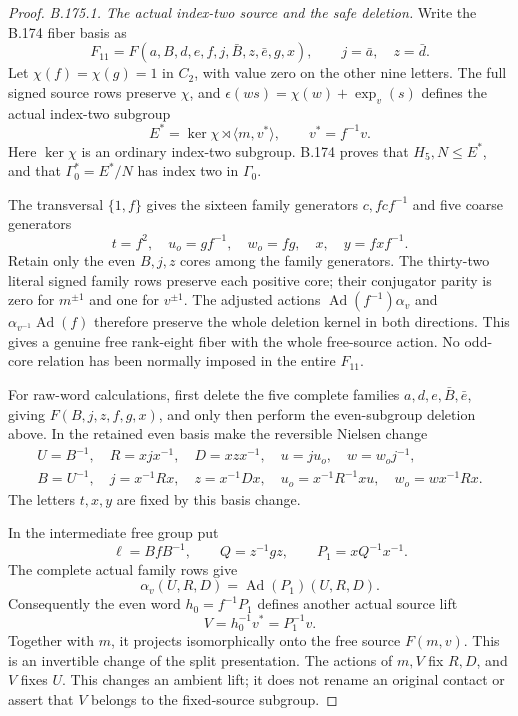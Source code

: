 \begin{proof}
\emph{B.175.1. The actual index-two source and the safe deletion.}
Write the B.174 fiber basis as
\[
 F_{11}=F(a,B,d,e,f,j,\bar B,z,\bar e,g,x),
 \qquad j=\bar a,\quad z=\bar d.
\]
Let \(\chi(f)=\chi(g)=1\) in \(C_2\), with value zero on the other
nine letters. The full signed source rows preserve \(\chi\), and
\(\epsilon(ws)=\chi(w)+\operatorname{exp}_v(s)\) defines the actual
index-two subgroup
\[
 E^*=\ker\chi\rtimes\langle m,v^*\rangle,
                     \qquad v^*=f^{-1}v.
 \tag{B.175.1}
\]
Here \(\ker\chi\) is an ordinary index-two subgroup. B.174 proves
that \(H_5,N\le E^*\), and that \(\Gamma _0^*=E^*/N\) has
index two in \(\Gamma _0\).

The transversal \(\{1,f\}\) gives the sixteen family generators
\(c,fcf^{-1}\) and five coarse generators
\[
              t=f^2,\quad u_o=gf^{-1},\quad w_o=fg,
                    \quad x,\quad y=fxf^{-1}.
\]
Retain only the even \(B,j,z\) cores among the family generators.
The thirty-two literal signed family rows preserve each positive core;
their conjugator parity is zero for \(m^{\pm1}\) and one for
\(v^{\pm1}\). The adjusted actions
\(\operatorname{Ad}(f^{-1})\alpha_v\) and
\(\alpha_{v^{-1}}\operatorname{Ad}(f)\) therefore preserve the whole
deletion kernel in both directions. This gives a genuine free rank-eight
fiber with the whole free-source action. No odd-core relation has been
normally imposed in the entire \(F_{11}\).

For raw-word calculations, first delete the five complete families
\(a,d,e,\bar B,\bar e\), giving \(F(B,j,z,f,g,x)\), and only then
perform the even-subgroup deletion above. In the retained even basis
make the reversible Nielsen change
\begin{equation}\label{eq:B175-pre-basis}
\begin{gathered}
 U=B^{-1},\quad R=xjx^{-1},\quad D=xzx^{-1},\quad
 u=ju_o,\quad w=w_oj^{-1},\\
 B=U^{-1},\quad j=x^{-1}Rx,\quad z=x^{-1}Dx,\quad
 u_o=x^{-1}R^{-1}xu,\quad w_o=wx^{-1}Rx.
\end{gathered}
\end{equation}
The letters \(t,x,y\) are fixed by this basis change.

In the intermediate free group put
\[
 \ell=BfB^{-1},\qquad Q=z^{-1}gz,\qquad
 P_1=xQ^{-1}x^{-1}.
\]
The complete actual family rows give
\[
 \alpha_v(U,R,D)=\operatorname{Ad}(P_1)(U,R,D).
\]
Consequently the even word \(h_0=f^{-1}P_1\) defines another actual
source lift
\[
              V=h_0^{-1}v^*=P_1^{-1}v.
 \tag{B.175.2}
\]
Together with \(m\), it projects isomorphically onto the free source
\(F(m,v)\). This is an invertible change of the split presentation.
The actions of \(m,V\) fix \(R,D\), and \(V\) fixes \(U\).
This changes an ambient lift; it does not rename an original contact or
assert that \(V\) belongs to the fixed-source subgroup.


\end{proof}
